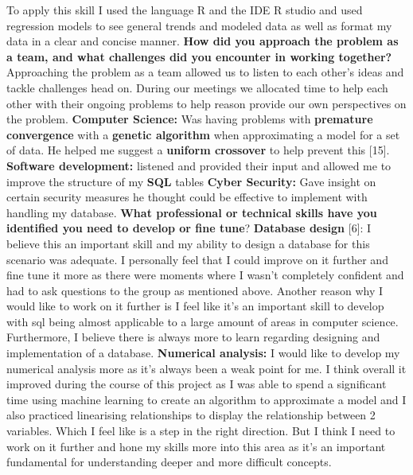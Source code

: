 \documentclass[../main.tex]{subfiles}
\begin{document}
\newline
\newline
To apply this skill I used the language R and the IDE R studio and used regression models to see general trends and modeled data as well as format my data in a clear and concise manner.
\newline
\newline
\textbf{How did you approach the problem as a team, and what challenges did you encounter in working together?}
\newline
\newline
Approaching the problem as a team allowed us to listen to each other's ideas and tackle challenges head on. During our meetings we allocated time to help each other with their ongoing problems to help reason provide our own perspectives on the problem.
\newline
\newline
\textbf{Computer Science:} Was having problems with \textbf{premature convergence} with a \textbf{genetic algorithm} when approximating a model for a set of data. He helped me suggest a \textbf{uniform crossover} to help prevent this [15]. 
\newline
\newline
\textbf{Software development:} listened and provided their input and allowed me to improve the structure of my \textbf{SQL} tables 
\newline
\newline
\textbf{Cyber Security:} Gave insight on certain security measures he thought could be effective to implement with handling my database.
\newline
\newline
\textbf{What professional or technical skills have you identified you need to develop or fine tune}?
\newline
\newline
\textbf{Database design} [6]: I believe this an important skill and my ability to design a database for this scenario was adequate. I personally feel that I could improve on it further and fine tune it more as there were moments where I wasn’t completely confident and had to ask questions to the group as mentioned above. Another reason why I would like to work on it further is I feel like it's an important skill to develop with sql being almost applicable to a large amount of areas in computer science. Furthermore, I believe there is always more to learn regarding designing and implementation of a database.
\newline
\newline
\textbf{Numerical analysis:} I would like to develop my numerical analysis more as it's always been a weak point for me. I think overall it improved during the course of this project as I was able to spend a significant time using machine learning to create an algorithm to approximate a model and I also practiced linearising relationships to display the relationship between 2 variables. Which I feel like is a step in the right direction. But I think I need to work on it further and hone my skills more into this area as it's an important fundamental for understanding deeper and more difficult concepts.
\newline
\end{document}
